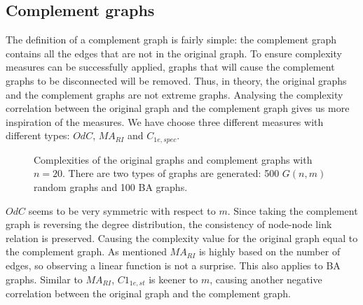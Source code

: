 \documentclass[12pt]{article}
\begin{document}
\subsection{Complement graphs}
The definition of a complement graph is fairly simple: the complement graph contains all the edges that are not in the original graph. To ensure complexity measures can be successfully applied, graphs that will cause the complement graphs to be disconnected will be removed. Thus, in theory, the original graphs and the complement graphs are not extreme graphs. Analysing the complexity correlation between the original graph and the complement graph gives us more inspiration of the measures. We have choose three different measures with different types: $OdC$, $MA_{RI}$ and $C_{1e,spec}$.
\begin{figure}[h!]
    \caption{Complexities of the original graphs and complement graphs with $n=20$. There are two types of graphs are generated: 500 $G(n,m)$ random graphs and 100 BA graphs.}
    \label{fig:complement}
\end{figure}
\noindent
$OdC$ seems to be very symmetric with respect to $m$. Since taking the complement graph is reversing the degree distribution, the consistency of node-node link relation is preserved. Causing the complexity value for the original graph equal to the complement graph. As mentioned $MA_{RI}$ is highly based on the number of edges, so observing a linear function is not a surprise. This also applies to BA graphs. Similar to $MA_{RI}$, $C1_{1e,st}$ is keener to $m$, causing another negative correlation between the original graph and the complement graph.\\
\end{document}
